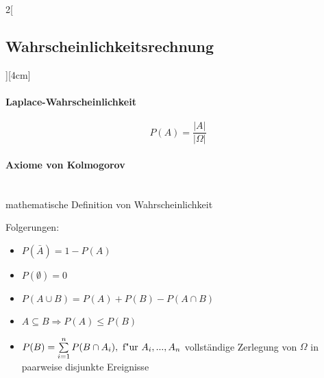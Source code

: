 \documentclass[8pt]{extarticle}
\begin{document}
\begin{multicols}{2}[\subsection{Wahrscheinlichkeitsrechnung}][4cm]


\paragraph{Laplace-Wahrscheinlichkeit}

$$P(A)=\frac{|A|}{|\Omega|}$$


\paragraph{Axiome von Kolmogorov} \ \\

\noindent mathematische Definition von Wahrscheinlichkeit



\begin{Mathfolg}

Folgerungen:
\begin{itemize}
\item $P(\bar{A})=1-P(A)$
\item $P(\emptyset)=0$
\item $P(A\cup B)=P(A)+P(B)-P(A\cap B)$
\item $A \subseteq B \Rightarrow P(A) \le P(B)$
\item $P(B)=\sum\limits_{i=1}^n P(B\cap A_i), \textnormal{ f"ur } A_i,...,A_n$  vollst\"andige Zerlegung von  $\Omega$  in paarweise disjunkte Ereignisse
\end{itemize}

\end{Mathfolg}


\end{multicols}
\end{document}
